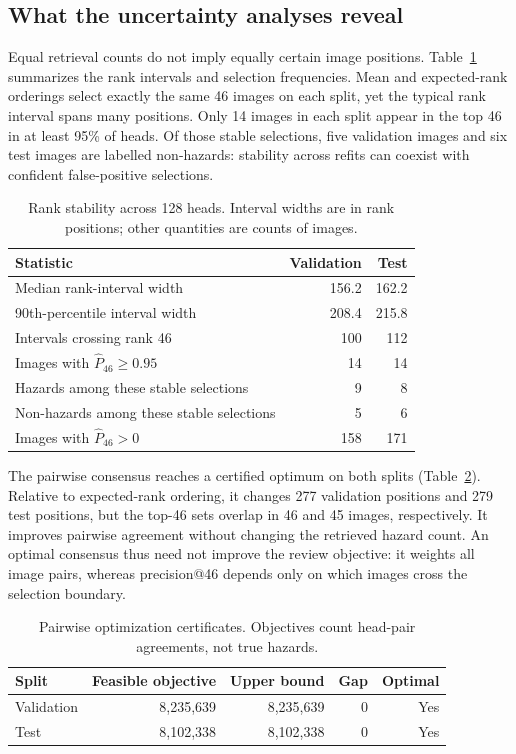 \documentclass[10pt,a4paper]{article}
\begin{document}
\subsection{What the uncertainty analyses reveal}
Equal retrieval counts do not imply equally certain image positions.
Table~\ref{tab:stability} summarizes the rank intervals and selection frequencies.
Mean and expected-rank orderings select exactly the same 46 images on each split,
yet the typical rank interval spans many positions. Only 14 images in each split
appear in the top 46 in at least 95\% of heads. Of those stable selections, five
validation images and six test images are labelled non-hazards: stability across
refits can coexist with confident false-positive selections.
\begin{table}[H]
\centering
\caption{Rank stability across 128 heads. Interval widths are in rank positions; other quantities are counts of images.}
\label{tab:stability}
\small
\begin{tabular}{lrr}
\toprule
Statistic & Validation & Test \\
\midrule
Median rank-interval width & 156.2 & 162.2 \\
90th-percentile interval width & 208.4 & 215.8 \\
Intervals crossing rank 46 & 100 & 112 \\
Images with $\widehat P_{46}\geq0.95$ & 14 & 14 \\
Hazards among these stable selections & 9 & 8 \\
Non-hazards among these stable selections & 5 & 6 \\
Images with $\widehat P_{46}>0$ & 158 & 171 \\
\bottomrule
\end{tabular}
\end{table}

The pairwise consensus reaches a certified optimum on both splits
(Table~\ref{tab:optimality}). Relative to expected-rank ordering, it changes 277
validation positions and 279 test positions, but the top-46 sets overlap in 46
and 45 images, respectively. It improves pairwise agreement without changing
the retrieved hazard count. An optimal consensus thus need not improve the
review objective: it weights all image pairs, whereas precision@46 depends
only on which images cross the selection boundary.
\begin{table}[H]
\centering
\caption{Pairwise optimization certificates. Objectives count head-pair agreements, not true hazards.}
\label{tab:optimality}
\small
\begin{tabular}{lrrrr}
\toprule
Split & Feasible objective & Upper bound & Gap & Optimal \\
\midrule
Validation & 8,235,639 & 8,235,639 & 0 & Yes \\
Test & 8,102,338 & 8,102,338 & 0 & Yes \\
\bottomrule
\end{tabular}
\end{table}
\end{document}
